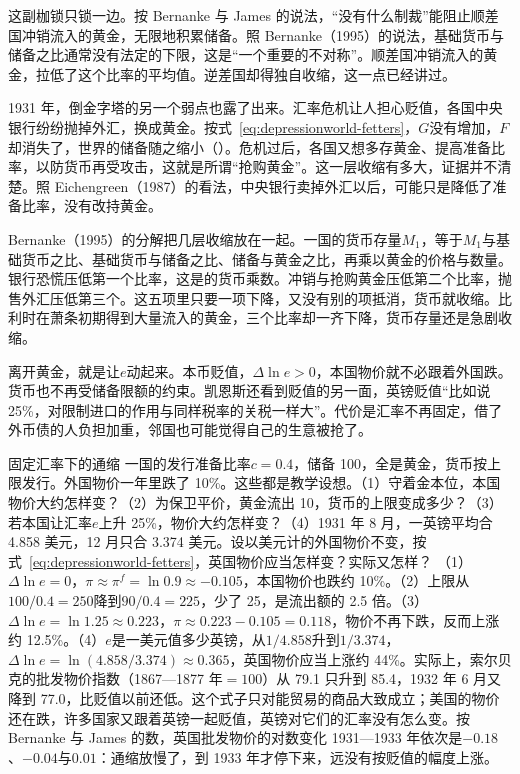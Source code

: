 这副枷锁只锁一边。按 Bernanke 与 James 的说法，“没有什么制裁”能阻止顺差国冲销流入的黄金，无限地积累储备\cite{bernanke1991}。照 Bernanke（1995）的说法，基础货币与储备之比通常没有法定的下限，这是“一个重要的不对称”\cite{bernanke1995}。顺差国冲销流入的黄金，拉低了这个比率的平均值\cite{bernanke1995}。逆差国却得独自收缩，这一点已经讲过。

1931 年，倒金字塔的另一个弱点也露了出来。汇率危机让人担心贬值，各国中央银行纷纷抛掉外汇，换成黄金\cite{bernanke1991,bernanke1995}。按式~\eqref{eq:depressionworld-fetters}，$G$没有增加，$F$却消失了，世界的储备随之缩小（）。危机过后，各国又想多存黄金、提高准备比率，以防货币再受攻击，这就是所谓“抢购黄金”\cite{bernanke1995}。这一层收缩有多大，证据并不清楚。照 Eichengreen（1987）的看法，中央银行卖掉外汇以后，可能只是降低了准备比率，没有改持黄金\cite{bernanke1991}。

Bernanke（1995）的分解把几层收缩放在一起。一国的货币存量$M_1$，等于$M_1$与基础货币之比、基础货币与储备之比、储备与黄金之比，再乘以黄金的价格与数量\cite{bernanke1995}。银行恐慌压低第一个比率，这是的货币乘数。冲销与抢购黄金压低第二个比率，抛售外汇压低第三个\cite{bernanke1995}。这五项里只要一项下降，又没有别的项抵消，货币就收缩。比利时在萧条初期得到大量流入的黄金，三个比率却一齐下降，货币存量还是急剧收缩\cite{bernanke1995}。

离开黄金，就是让$e$动起来。本币贬值，$\Delta\ln e>0$，本国物价就不必跟着外国跌。货币也不再受储备限额的约束。凯恩斯还看到贬值的另一面，英镑贬值“比如说 25\%，对限制进口的作用与同样税率的关税一样大”\cite{keynes1931}。代价是汇率不再固定，借了外币债的人负担加重，邻国也可能觉得自己的生意被抢了。

\begin{example}{固定汇率下的通缩}\label{ex:depressionworld-fetters}
一国的发行准备比率$c=0.4$，储备 100，全是黄金，货币按上限发行。外国物价一年里跌了 10\%。这些都是教学设想。（1）守着金本位，本国物价大约怎样变？（2）为保卫平价，黄金流出 10，货币的上限变成多少？（3）若本国让汇率$e$上升 25\%，物价大约怎样变？（4）1931 年 8 月，一英镑平均合 4.858 美元，12 月只合 3.374 美元。设以美元计的外国物价不变，按式~\eqref{eq:depressionworld-fetters}，英国物价应当怎样变？实际又怎样？
\solution （1）$\Delta\ln e=0$，$\pi\approx\pi^{f}=\ln0.9\approx-0.105$，本国物价也跌约 10\%。（2）上限从$100/0.4=250$降到$90/0.4=225$，少了 25，是流出额的 2.5 倍。（3）$\Delta\ln e=\ln1.25\approx0.223$，$\pi\approx0.223-0.105=0.118$，物价不再下跌，反而上涨约 12.5\%。（4）$e$是一美元值多少英镑，从$1/4.858$升到$1/3.374$，$\Delta\ln e=\ln(4.858/3.374)\approx0.365$，英国物价应当上涨约 44\%。实际上，索尔贝克的批发物价指数（1867—1877 年$=100$）从 79.1 只升到 85.4，1932 年 6 月又降到 77.0，比贬值以前还低\cite{boe2017}。这个式子只对能贸易的商品大致成立；美国的物价还在跌，许多国家又跟着英镑一起贬值，英镑对它们的汇率没有怎么变。按 Bernanke 与 James 的数，英国批发物价的对数变化 1931—1933 年依次是$-0.18$、$-0.04$与$0.01$\cite{bernanke1991}：通缩放慢了，到 1933 年才停下来，远没有按贬值的幅度上涨。
\end{example}

